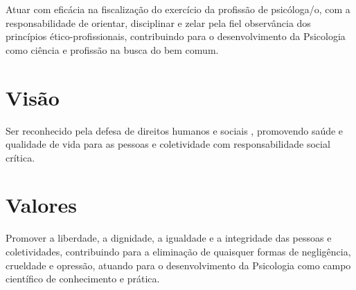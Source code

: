 Atuar com eficácia na fiscalização do exercício da profissão de psicóloga/o, com a responsabilidade de orientar, disciplinar e zelar pela fiel observância dos princípios ético-profissionais, contribuindo para o desenvolvimento da Psicologia como ciência e profissão na busca do bem comum.

\section*{Visão}

Ser reconhecido pela defesa de direitos humanos e sociais , promovendo saúde e qualidade de vida para as pessoas e coletividade com responsabilidade social crítica.

\section*{Valores}

Promover a liberdade, a dignidade, a igualdade e a integridade das pessoas e coletividades, contribuindo para a eliminação de quaisquer formas de negligência, crueldade e opressão, atuando para o desenvolvimento da Psicologia como campo científico de conhecimento e prática.
